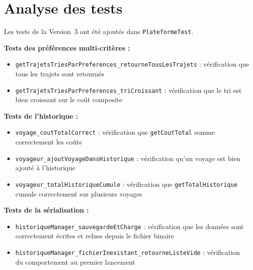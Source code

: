\documentclass[fontsize=10pt,oneside,parskip=half]{scrreprt}
\newcommand{\ic}[1]{{\setlength{\fboxsep}{2pt}\colorbox{BeigeSerein}{\texttt{#1}}}}
\begin{document}
\section{Analyse des tests}

Les tests de la Version~3 ont été ajoutés dans \ic{PlateformeTest}.

\noindent\textbf{Tests des préférences multi-critères :}
\begin{itemize}
  \item \ic{getTrajetsTriesParPreferences\_retourneTousLesTrajets} : vérification que
        tous les trajets sont retournés
  \item \ic{getTrajetsTriesParPreferences\_triCroissant} : vérification que le tri est
        bien croissant sur le coût composite
\end{itemize}

\noindent\textbf{Tests de l'historique :}
\begin{itemize}
  \item \ic{voyage\_coutTotalCorrect} : vérification que \ic{getCoutTotal} somme
        correctement les coûts
  \item \ic{voyageur\_ajoutVoyageDansHistorique} : vérification qu'un voyage est bien
        ajouté à l'historique
  \item \ic{voyageur\_totalHistoriqueCumule} : vérification que
        \ic{getTotalHistorique} cumule correctement sur plusieurs voyages
\end{itemize}

\noindent\textbf{Tests de la sérialisation :}
\begin{itemize}
  \item \ic{historiqueManager\_sauvegardeEtCharge} : vérification que les données
        sont correctement écrites et relues depuis le fichier binaire
  \item \ic{historiqueManager\_fichierInexistant\_retourneListeVide} : vérification du
        comportement au premier lancement
\end{itemize}
\end{document}
